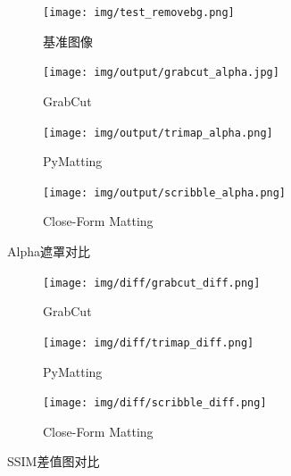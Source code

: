 \documentclass[scheme=chinese,a4paper]{article}
\begin{document}
\begin{figure}[hbt]
  \centering
  \begin{subfigure}{0.23\textwidth}
    \centering
    \texttt{[image: img/test\_removebg.png]}
    \caption{基准图像}
  \end{subfigure}
  \begin{subfigure}{0.23\textwidth}
    \centering
    \texttt{[image: img/output/grabcut\_alpha.jpg]}
    \caption{GrabCut}
  \end{subfigure}
  \begin{subfigure}{0.23\textwidth}
    \centering
    \texttt{[image: img/output/trimap\_alpha.png]}
    \caption{PyMatting}
  \end{subfigure}
  \begin{subfigure}{0.23\textwidth}
    \centering
    \texttt{[image: img/output/scribble\_alpha.png]}
    \caption{Close-Form Matting}
  \end{subfigure}
  \caption{Alpha遮罩对比}
  \end{figure}

  \begin{figure}[hbt]
    \centering
    \begin{subfigure}{0.32\textwidth}
      \centering
      \texttt{[image: img/diff/grabcut\_diff.png]}
      \caption{GrabCut}
    \end{subfigure}
    \begin{subfigure}{0.32\textwidth}
      \centering
      \texttt{[image: img/diff/trimap\_diff.png]}
      \caption{PyMatting}
    \end{subfigure}
    \begin{subfigure}{0.32\textwidth}
      \centering
      \texttt{[image: img/diff/scribble\_diff.png]}
      \caption{Close-Form Matting}
    \end{subfigure}
    \caption{SSIM差值图对比}
    \end{figure}
\end{document}
